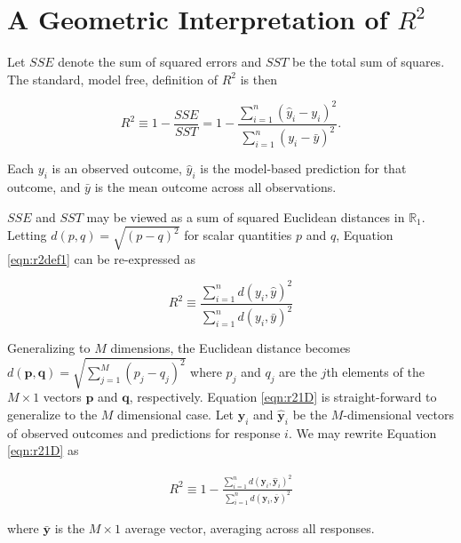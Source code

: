 \hypertarget{a-geometric-interpretation-of-r2}{%
\section{\texorpdfstring{A Geometric Interpretation of \(R^2\)}{A Geometric Interpretation of R\^{}2}}\label{a-geometric-interpretation-of-r2}}

Let \(SSE\) denote the sum of squared errors and \(SST\) be the total sum of squares. The standard, model free, definition of \(R^2\) is then

\begin{equation}
\label{eqn:r2def1}
R^2 
\equiv 1 - \frac{SSE}{SST} = 1 - 
\frac{\sum_{i=1}^n{(\hat{y}_i-y_i)^2}}{\sum_{i=1}^n{(y_i-\bar{y})^2}}.
\end{equation}

Each \(y_i\) is an observed outcome, \(\hat{y}_i\) is the model-based prediction for that outcome, and \(\bar{y}\) is the mean outcome across all observations.

\(SSE\) and \(SST\) may be viewed as a sum of squared Euclidean distances in \(\mathbb{R}_1\). Letting \(d(p,q) = \sqrt{(p - q)^2}\) for scalar quantities \(p\) and \(q\), Equation \eqref{eqn:r2def1} can be re-expressed as

\begin{equation}
\label{eqn:r21D}
    R^2 
    \equiv 
    \frac{\sum_{i=1}^n{d(y_i, \hat{y})^2}}{\sum_{i=1}^n{d(y_i,\bar{y})^2}}
\end{equation}

Generalizing to \(M\) dimensions, the Euclidean distance becomes \(d(\boldsymbol{p},\boldsymbol{q}) = \sqrt{\sum_{j=1}^M(p_j - q_j)^2}\) where \(p_j\) and \(q_j\) are the \(j\)th elements of the \(M \times 1\) vectors \(\boldsymbol{p}\) and \(\boldsymbol{q}\), respectively. Equation \eqref{eqn:r21D} is straight-forward to generalize to the \(M\) dimensional case. Let \(\boldsymbol{y}_i\) and \(\hat{\boldsymbol{y}}_i\) be the \(M\)-dimensional vectors of observed outcomes and predictions for response \(i\). We may rewrite Equation \eqref{eqn:r21D} as

\begin{align}
\label{eqn:r2def2}
    R^2 \equiv 
        1 - \frac{\sum_{i=1}^n d(\boldsymbol{y}_i,\hat{\boldsymbol{y}}_i)^2}{\sum_{i=1}^n d(\boldsymbol{y}_i,\bar{\boldsymbol{y}})^2}
\end{align}

where \(\bar{\boldsymbol{y}}\) is the \(M\times 1\) average vector, averaging across all responses.

